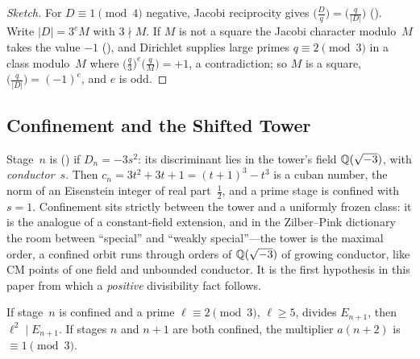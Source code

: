 \begin{proof}[Sketch]
For $D \equiv 1 \pmod 4$ negative, Jacobi reciprocity gives
$\bigl(\tfrac{D}{q}\bigr) = \bigl(\tfrac{q}{|D|}\bigr)$
().
Write $|D| = 3^e M$ with $3 \nmid M$.  If $M$ is not a square the Jacobi
character modulo~$M$ takes the value $-1$
(),
and Dirichlet supplies large primes $q \equiv 2 \pmod 3$ in a class
modulo~$M$ where $\bigl(\tfrac{q}{3}\bigr)^e\bigl(\tfrac{q}{M}\bigr) = +1$,
a contradiction; so $M$ is a square, $\bigl(\tfrac{q}{|D|}\bigr) =
(-1)^e$, and $e$ is odd.
\end{proof}

\subsection{Confinement and the Shifted Tower}
\label{sec:confinement}

Stage~$n$ is 
() if $D_n = -3s^2$: its
discriminant lies in the tower's field $\mathbb{Q}(\sqrt{-3})$, with
\emph{conductor}~$s$.  Then $c_n = 3t^2+3t+1 = (t{+}1)^3 - t^3$ is a cuban
number, the norm of an Eisenstein integer of real part~$\tfrac12$, and a
prime stage is confined with $s = 1$.  Confinement sits strictly between
the tower and a uniformly frozen class: it is the analogue of a
constant-field extension, and in the Zilber--Pink dictionary the room
between ``special'' and ``weakly special''---the tower is the maximal
order, a confined orbit runs through orders of $\mathbb{Q}(\sqrt{-3})$ of growing
conductor, like CM points of one field and unbounded conductor.  It is the
first hypothesis in this paper from which a \emph{positive} divisibility
fact follows.

\begin{theorem}
\label{thm:confined-divisibility}
If stage~$n$ is confined and a prime $\ell \equiv 2 \pmod 3$, $\ell \geq
5$, divides $E_{n+1}$, then $\ell^2 \mid E_{n+1}$.  If stages $n$ and $n{+}1$
are both confined, the multiplier $a(n{+}2)$ is $\equiv 1 \pmod 3$.
\end{theorem}

